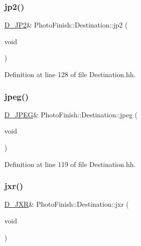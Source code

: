 \subsubsection{\texorpdfstring{jp2()}{jp2()}}
{\footnotesize\ttfamily \hyperlink{class_photo_finish_1_1_d___j_p2}{D\+\_\+\+J\+P2}\& Photo\+Finish\+::\+Destination\+::jp2 (\begin{DoxyParamCaption}\item[{void}]{ }\end{DoxyParamCaption})\hspace{0.3cm}{\ttfamily [inline]}}



Definition at line 128 of file Destination.\+hh.

\mbox{\label{class_photo_finish_1_1_destination_a1e30d58e017120973de516de2336fe59}} 
\subsubsection{\texorpdfstring{jpeg()}{jpeg()}}
{\footnotesize\ttfamily \hyperlink{class_photo_finish_1_1_d___j_p_e_g}{D\+\_\+\+J\+P\+EG}\& Photo\+Finish\+::\+Destination\+::jpeg (\begin{DoxyParamCaption}\item[{void}]{ }\end{DoxyParamCaption})\hspace{0.3cm}{\ttfamily [inline]}}



Definition at line 119 of file Destination.\+hh.

\mbox{\label{class_photo_finish_1_1_destination_a90030e65830659b6da72d1d66370dfbc}} 
\subsubsection{\texorpdfstring{jxr()}{jxr()}}
{\footnotesize\ttfamily \hyperlink{class_photo_finish_1_1_d___j_x_r}{D\+\_\+\+J\+XR}\& Photo\+Finish\+::\+Destination\+::jxr (\begin{DoxyParamCaption}\item[{void}]{ }\end{DoxyParamCaption})\hspace{0.3cm}{\ttfamily [inline]}}



